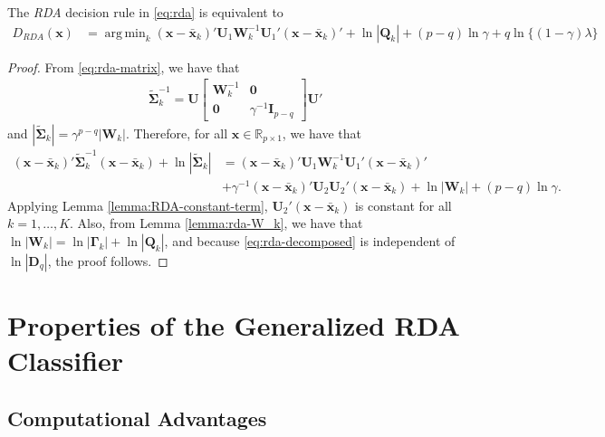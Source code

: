\documentclass[11pt]{article}
\newcommand{\xbar}{\bar{\bm x}}
\DeclareMathOperator*{\argmin}{arg\,min}
\begin{document}
\begin{thm}
	The \emph{RDA} decision rule in \eqref{eq:rda} is equivalent to
	\begin{align}
		D_{RDA}(\bm x) &= \argmin_k (\bm x - \xbar_k)' \bm U_1 \bm W_k^{-1} \bm U_1' (\bm x - \xbar_k)' + \ln |\bm Q_k| + (p - q) \ln \gamma + q \ln \{ (1 - \gamma) \lambda \} \label{eq:rda-decomposed}
	\end{align}
	
\end{thm}
\begin{proof}
	From \eqref{eq:rda-matrix}, we have that
	\begin{align*}
		\tilde{\bm \Sigma}_k^{-1} = \bm U \begin{bmatrix}
			\bm W_k^{-1} & \bm 0\\
			\bm 0 & \gamma^{-1} \bm I_{p - q}
		\end{bmatrix} \bm U'
	\end{align*}
	and $|\tilde{\bm \Sigma}_k| = \gamma^{p-q} | \bm W_k |$. Therefore, for all $\bm x \in \mathbb{R}_{p \times 1}$, we have that
	\begin{align*}
	(\bm x - \xbar_k)' \tilde{\bm\Sigma}_k^{-1}(\bm x - \xbar_k)  + \ln |\tilde{\bm\Sigma}_k| &= (\bm x - \xbar_k)' \bm U_1 \bm W_k^{-1} \bm U_1' (\bm x - \xbar_k)'\\
	&+ \gamma^{-1} (\bm x - \xbar_k)' \bm U_2 \bm U_2' (\bm x - \xbar_k) + \ln | \bm W_k | + (p - q) \ln \gamma.
	\end{align*}
Applying Lemma \ref{lemma:RDA-constant-term}, $\bm U_2' (\bm x - \xbar_k)$ is constant for all $k = 1, \ldots, K$. Also, from Lemma \ref{lemma:rda-W_k}, we have that $\ln |\bm W_k| = \ln |\bm \Gamma_k| + \ln |\bm Q_k|$, and because \eqref{eq:rda-decomposed} is independent of $\ln |\bm D_q|$, the proof follows.
\end{proof}

\section{Properties of the Generalized RDA Classifier}

\subsection{Computational Advantages}
\end{document}
